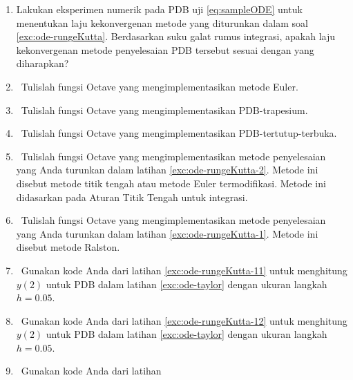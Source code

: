 \begin{small}
\begin{enumerate}
\begin{enumerate}
\[
\frac{h}{18}\left(5f\left(x_{0}+\frac{\sqrt{5}-\sqrt{3}}{2\sqrt{5}}h\right)+8f\left(x_{0}+\frac{1}{2}h\right)5f\left(x_{0}+\frac{\sqrt{5}+\sqrt{3}}{2\sqrt{5}}h\right)\right)+O(h^{7})
\]
\end{enumerate}
\item \label{exc:ode-rungeKutta-16}Lakukan eksperimen numerik pada PDB
uji \ref{eq:sampleODE} untuk menentukan laju kekonvergenan metode
yang diturunkan dalam soal \ref{exc:ode-rungeKutta}. Berdasarkan
suku galat rumus integrasi, apakah laju kekonvergenan metode penyelesaian
PDB tersebut sesuai dengan yang diharapkan?
\item \octave\ \label{exc:ode-rungeKutta-11}Tulislah fungsi Octave yang
mengimplementasikan metode Euler.  \hasananswer 
\item \octave\ \label{exc:ode-rungeKutta-12}Tulislah fungsi Octave yang
mengimplementasikan PDB-trapesium.
\item \octave\ \label{exc:ode-rungeKutta-13}Tulislah fungsi Octave yang
mengimplementasikan PDB-tertutup-terbuka.
\item \octave\ \label{exc:ode-rungeKutta-14}Tulislah fungsi Octave yang
mengimplementasikan metode penyelesaian yang Anda turunkan dalam latihan
\ref{exc:ode-rungeKutta-2}. Metode ini disebut metode titik tengah
atau metode Euler termodifikasi.
Metode ini didasarkan pada Aturan Titik Tengah untuk integrasi. \hasananswer 
\item \octave\ \label{exc:ode-rungeKutta-15}Tulislah fungsi Octave yang
mengimplementasikan metode penyelesaian yang Anda turunkan dalam latihan
\ref{exc:ode-rungeKutta-1}. Metode ini disebut metode Ralston. \hasananswer {}
\item \octave\ \label{exc:ode-rungeKutta-17}Gunakan kode Anda dari latihan
\ref{exc:ode-rungeKutta-11} untuk menghitung $y(2)$ untuk PDB dalam
latihan \ref{exc:ode-taylor}  dengan ukuran
langkah $h=0.05$.  \haspartwithsolution  \haspartwithanswer 
\item \octave\ \label{exc:ode-rungeKutta-18}Gunakan kode Anda dari latihan
\ref{exc:ode-rungeKutta-12} untuk menghitung $y(2)$ untuk PDB dalam
latihan \ref{exc:ode-taylor}  dengan ukuran
langkah $h=0.05$.  \haspartwithsolution  \haspartwithanswer 
\item \octave\ \label{exc:ode-rungeKutta-19}Gunakan kode Anda dari latihan

\end{enumerate}
\end{small}
